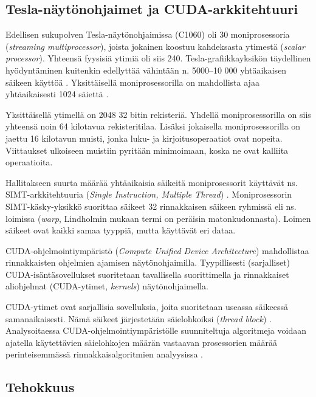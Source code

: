 \documentclass[a4paper,11pt]{article}
\begin{document}
\subsection{Tesla-näytönohjaimet ja CUDA-arkkitehtuuri}

Edellisen sukupolven Tesla-näytönohjaimissa (C1060) oli 30 moniprosessoria (\emph{\foreignlanguage{english}{streaming multiprocessor}}), joista jokainen koostuu kahdeksasta ytimestä (\emph{\foreignlanguage{english}{scalar processor}}). Yhteensä fyysisiä ytimiä oli siis 240. Tesla-grafiikkayksikön täydellinen hyödyntäminen kuitenkin edellyttää vähintään n. 5000--10 000 yhtäaikaisen säikeen käyttöä \cite{leischner2010}. Yksittäisellä moniprosessorilla on mahdollista ajaa yhtäaikaisesti 1024 säiettä \cite{satish2009}.

Yksittäisellä ytimellä on 2048 32 bitin rekisteriä. Yhdellä moniprosessorilla on siis yhteensä noin 64 kilotavua rekisteritilaa. Lisäksi jokaisella moniprosessorilla on jaettu 16 kilotavun muisti, jonka luku- ja kirjoitusoperaatiot ovat nopeita. Viittaukset ulkoiseen muistiin pyritään minimoimaan, koska ne ovat kalliita operaatioita.

Hallitakseen suurta määrää yhtäaikaisia säikeitä moniprosessorit käyttävät ns. SIMT-arkkitehtuuria (\emph{\foreignlanguage{english}{Single Instruction, Multiple Thread}}) \cite{lindholm2008}. Moniprosessorin SIMT-käsky-yksikkö suorittaa säikeet 32 rinnakkaisen säikeen ryhmissä eli ns. loimissa (\emph{\foreignlanguage{english}{warp}}, Lindholmin \cite{lindholm2008} mukaan termi on peräisin matonkudonnasta). Loimen säikeet ovat kaikki samaa tyyppiä, mutta käyttävät eri dataa.

CUDA-ohjelmointiympäristö (\emph{\foreignlanguage{english}{Compute Unified Device Architecture}}) mahdollistaa rinnakkaisten ohjelmien ajamisen näytönohjaimilla. Tyypillisesti (sarjalliset) CUDA-isäntäsovellukset suoritetaan tavallisella suorittimella ja rinnakkaiset aliohjelmat (CUDA-ytimet, \emph{\foreignlanguage{english}{kernels}}) näytönohjaimella.

CUDA-ytimet ovat sarjallisia sovelluksia, joita suoritetaan useassa säikeessä samanaikaisesti. Nämä säikeet järjestetään säielohkoiksi (\emph{\foreignlanguage{english}{thread block}}) \cite{cudaprogramming}. Analysoitaessa CUDA-ohjelmointiympäristölle suunniteltuja algoritmeja voidaan ajatella käytettävien säielohkojen määrän vastaavan prosessorien määrää perinteisemmässä rinnakkaisalgoritmien analyysissa \cite{satish2009}.

\subsection{Tehokkuus}
\end{document}
